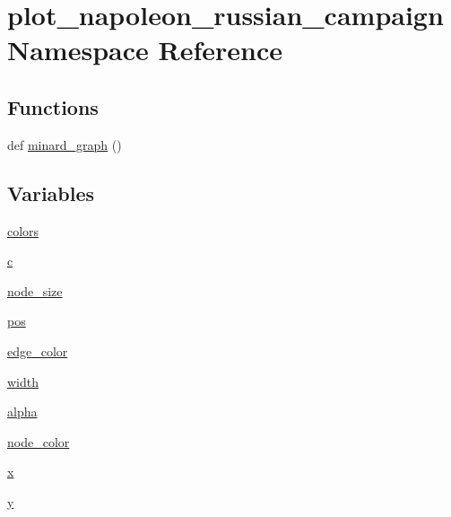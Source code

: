 \hypertarget{namespaceplot__napoleon__russian__campaign}{}\section{plot\+\_\+napoleon\+\_\+russian\+\_\+campaign Namespace Reference}
\label{namespaceplot__napoleon__russian__campaign}
\subsection*{Functions}
\begin{DoxyCompactItemize}
\item 
def \hyperlink{namespaceplot__napoleon__russian__campaign_a2e50d97fac020124042e79da19b10162}{minard\+\_\+graph} ()
\end{DoxyCompactItemize}
\subsection*{Variables}
\begin{DoxyCompactItemize}
\item 
\hyperlink{namespaceplot__napoleon__russian__campaign_a8cfbf4369444fa3dbe539db8933f2003}{colors}
\item 
\hyperlink{namespaceplot__napoleon__russian__campaign_af2840e02593520d859d596bbe1bba88e}{c}
\item 
\hyperlink{namespaceplot__napoleon__russian__campaign_adc7398060ef20252ac67c8a2ecf061ee}{node\+\_\+size}
\item 
\hyperlink{namespaceplot__napoleon__russian__campaign_aecafc37e159f4d6b0e2f5dc04223e54f}{pos}
\item 
\hyperlink{namespaceplot__napoleon__russian__campaign_ac48c35aab71702c0ad5681e8cfc2094f}{edge\+\_\+color}
\item 
\hyperlink{namespaceplot__napoleon__russian__campaign_a94a968173bd62e5d97c35abe57652624}{width}
\item 
\hyperlink{namespaceplot__napoleon__russian__campaign_a371bbe259b7ffb273a69542d2803548b}{alpha}
\item 
\hyperlink{namespaceplot__napoleon__russian__campaign_ac76da97e94df94978b545d04ce91818b}{node\+\_\+color}
\item 
\hyperlink{namespaceplot__napoleon__russian__campaign_a236f258e0fbada70e87b026b47e43acd}{x}
\item 
\hyperlink{namespaceplot__napoleon__russian__campaign_a75e7a559c4e31da26b5e284af2066765}{y}
\end{DoxyCompactItemize}


